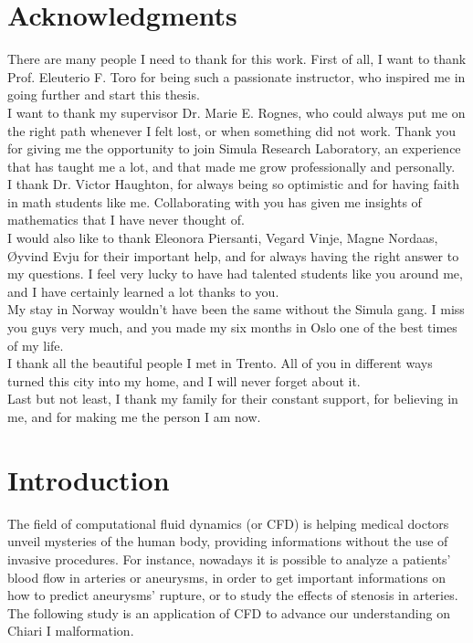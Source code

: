 \documentclass[a4paper,11pt,oneside]{book}
\begin{document}

\chapter*{\LARGE Acknowledgments}
There are many people I need to thank for this work. First of all, I want to thank Prof. Eleuterio F. Toro for being such a passionate instructor, who inspired me in going further and start this thesis. \\
I want to thank my supervisor Dr. Marie E. Rognes, who could always put me on the right path whenever I felt lost, or when something did not work. Thank you for giving me the opportunity to join Simula Research Laboratory, an experience that has taught me a lot, and that made me grow professionally and personally. \\
I thank Dr. Victor Haughton, for always being so optimistic and for having faith in math students like me. Collaborating with you has given me insights of mathematics that I have never thought of. \\

I would also like to thank Eleonora Piersanti, Vegard Vinje, Magne Nordaas, Øyvind Evju for their important help, and for always having the right answer to my questions. I feel very lucky to have had talented students like you around me, and I have certainly learned a lot thanks to you. \\

My stay in Norway  wouldn't have been the same without the Simula gang. I miss you guys very much, and you made my six months in Oslo one of the best times of my life. \\
I thank all the beautiful people I met in Trento. All of you in different ways turned this city into my home, and I will never forget about it. \\
Last but not least, I thank my family for their constant support, for believing in me, and for making me the person I am now.

\newpage




\newpage
\tableofcontents


\newpage
{}

\chapter{Introduction}
The field of computational fluid dynamics (or CFD) is helping medical doctors unveil mysteries of the human body, providing informations without the use of invasive procedures. For instance, nowadays it is possible to analyze a patients' blood flow in arteries or aneurysms, in order to get important informations on how to predict  aneurysms' rupture, or to study the effects of stenosis in arteries. The following study is an application of CFD to advance our understanding on Chiari I malformation.
\end{document}
